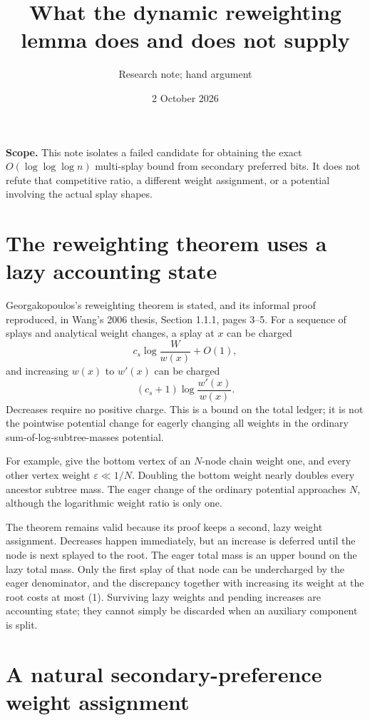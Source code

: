\documentclass[11pt]{article}
\title{What the dynamic reweighting lemma does and does not supply}
\author{Research note; hand argument}
\date{2 October 2026}
\begin{document}
\maketitle

\noindent\textbf{Scope.}
This note isolates a failed candidate for obtaining the exact
$O(\log\log\log n)$ multi-splay bound from secondary preferred bits.
It does not refute that competitive ratio, a different weight assignment,
or a potential involving the actual splay shapes.

\section{The reweighting theorem uses a lazy accounting state}

Georgakopoulos's reweighting theorem is stated, and its informal proof
reproduced, in Wang's 2006 thesis, Section 1.1.1, pages 3--5.
For a sequence of splays and analytical weight changes, a splay at $x$
can be charged
\[
 c_s\log\frac{W}{w(x)}+O(1),
\]
and increasing $w(x)$ to $w'(x)$ can be charged
\[
 (c_s+1)\log\frac{w'(x)}{w(x)}.
                                                        \tag{1}
\]
Decreases require no positive charge. This is a bound on the total
ledger; it is not the pointwise potential change for eagerly changing
all weights in the ordinary sum-of-log-subtree-masses potential.

For example, give the bottom vertex of an $N$-node chain weight one,
and every other vertex weight $\varepsilon\ll1/N$. Doubling the bottom
weight nearly doubles every ancestor subtree mass. The eager change
of the ordinary potential approaches $N$, although the logarithmic
weight ratio is only one.

The theorem remains valid because its proof keeps a second, lazy weight
assignment. Decreases happen immediately, but an increase is deferred
until the node is next splayed to the root. The eager total mass is an
upper bound on the lazy total mass. Only the first splay of that node
can be undercharged by the eager denominator, and the discrepancy
together with increasing its weight at the root costs at most (1).
Surviving lazy weights and pending increases are accounting state;
they cannot simply be discarded when an auxiliary component is split.

\section{A natural secondary-preference weight assignment}
\end{document}
